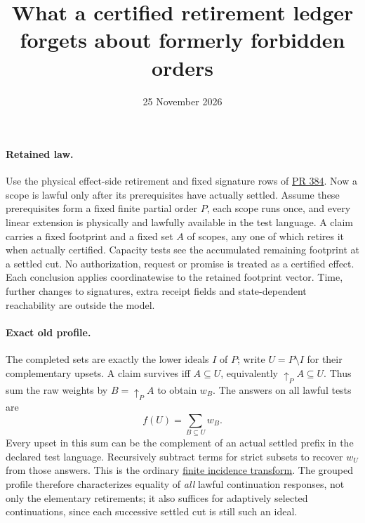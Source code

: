 \documentclass[11pt]{article}
\title{What a certified retirement ledger forgets about formerly forbidden orders}
\date{25 November 2026}
\begin{document}
\maketitle
\paragraph{Retained law.}
Use the physical effect-side retirement and fixed signature rows of
\href{https://github.com/eternal-november/eos-research-programmes/pull/384}{PR 384}.
Now a scope is lawful only after its prerequisites have actually settled. Assume these prerequisites form a fixed finite partial order \(P\), each scope runs once, and every linear extension is physically and lawfully available in the test language. A claim carries a fixed footprint and a fixed set \(A\) of scopes, any one of which retires it when actually certified. Capacity tests see the accumulated remaining footprint at a settled cut. No authorization, request or promise is treated as a certified effect. Each conclusion applies coordinatewise to the retained footprint vector. Time, further changes to signatures, extra receipt fields and state-dependent reachability are outside the model.
\paragraph{Exact old profile.}
The completed sets are exactly the lower ideals \(I\) of \(P\); write \(U=P\setminus I\) for their complementary upsets. A claim survives iff \(A\subseteq U\), equivalently \(\uparrow_P A\subseteq U\). Thus sum the raw weights by \(B=\uparrow_P A\) to obtain \(w_B\). The answers on all lawful tests are
\[
      f(U)=\sum_{B\subseteq U}w_B.
\]
Every upset in this sum can be the complement of an actual settled prefix in the declared test language. Recursively subtract terms for strict subsets to recover \(w_U\) from those answers. This is the ordinary
\href{https://webhomes.maths.ed.ac.uk/~v1ranick/papers/rota1.pdf}{finite incidence transform}.
The grouped profile therefore characterizes equality of \emph{all} lawful continuation responses, not only the elementary retirements; it also suffices for adaptively selected continuations, since each successive settled cut is still such an ideal.
\end{document}
